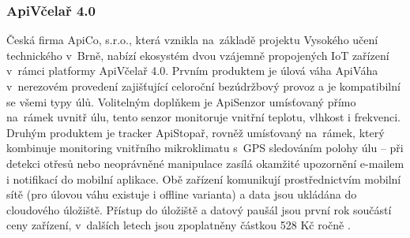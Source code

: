 \subsubsection*{ApiVčelař 4.0}
Česká firma ApiCo, s.r.o., která vznikla na~základě projektu Vysokého učení technického v~Brně, nabízí ekosystém dvou vzájemně propojených IoT zařízení v~rámci platformy ApiVčelař 4.0. Prvním produktem je úlová váha ApiVáha v~nerezovém provedení zajišťující celoroční bezúdržbový provoz a je kompatibilní se všemi typy úlů. Volitelným doplňkem je ApiSenzor umísťovaný přímo na~rámek uvnitř úlu, tento senzor monitoruje vnitřní teplotu, vlhkost i frekvenci. Druhým produktem je tracker ApiStopař, rovněž umísťovaný na~rámek, který kombinuje monitoring vnitřního mikroklimatu s~GPS sledováním polohy úlu -- při detekci otřesů nebo neoprávněné manipulace zasílá okamžité upozornění e-mailem i notifikací do mobilní aplikace. Obě zařízení komunikují prostřednictvím mobilní sítě (pro úlovou váhu existuje i offline varianta) a data jsou ukládána do cloudového úložiště. Přístup do úložiště a datový paušál jsou první rok součástí ceny zařízení, v~dalších letech jsou zpoplatněny částkou 528 Kč ročně \cite{apivcelar}.

